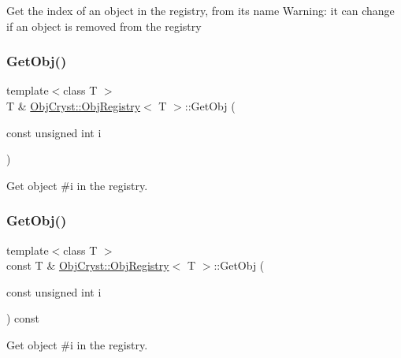 Get the index of an object in the registry, from its name Warning\+: it can change if an object is removed from the registry \mbox{\label{class_obj_cryst_1_1_obj_registry_a48ac4ceb55051339b0fbd0dd4ba8d61a}} 
\subsubsection{\texorpdfstring{GetObj()}{GetObj()}\hspace{0.1cm}{\footnotesize\ttfamily [1/6]}}
{\footnotesize\ttfamily template$<$class T $>$ \\
T \& \mbox{\hyperlink{class_obj_cryst_1_1_obj_registry}{Obj\+Cryst\+::\+Obj\+Registry}}$<$ T $>$\+::Get\+Obj (\begin{DoxyParamCaption}\item[{const unsigned int}]{i }\end{DoxyParamCaption})}

Get object \#i in the registry. \mbox{\label{class_obj_cryst_1_1_obj_registry_a9839646b3902eb9d57460bfcbb631d56}} 
\subsubsection{\texorpdfstring{GetObj()}{GetObj()}\hspace{0.1cm}{\footnotesize\ttfamily [2/6]}}
{\footnotesize\ttfamily template$<$class T $>$ \\
const T \& \mbox{\hyperlink{class_obj_cryst_1_1_obj_registry}{Obj\+Cryst\+::\+Obj\+Registry}}$<$ T $>$\+::Get\+Obj (\begin{DoxyParamCaption}\item[{const unsigned int}]{i }\end{DoxyParamCaption}) const}

Get object \#i in the registry. \mbox{\label{class_obj_cryst_1_1_obj_registry_addf46e1c23ead63e175f1168a7bf25c0}} 
